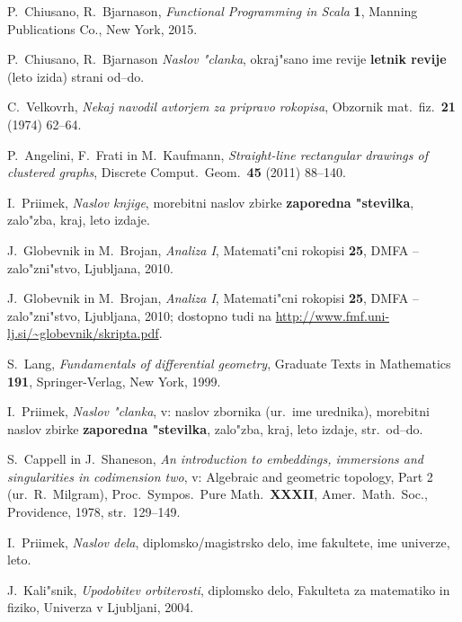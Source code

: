 \documentclass[12pt,a4paper]{amsart}
\theoremstyle{definition} %
\theoremstyle{plain} %
\begin{document}
\begin{thebibliography}{99}

P.~Chiusano, R.~Bjarnason, \emph{Functional Programming in Scala}  \textbf{1}, Manning Publications Co., New York, 2015.

P.~Chiusano, R.~Bjarnason \emph{Naslov "clanka}, okraj"sano ime revije \textbf{letnik revije} (leto izida) strani od--do.

C.~Velkovrh, \emph{Nekaj navodil avtorjem za pripravo rokopisa}, Obzornik mat.\ fiz.\ \textbf{21} (1974) 62--64.

P.~Angelini, F.~Frati in M.~Kaufmann, \emph{Straight-line rectangular drawings of clustered graphs}, Discrete Comput.\ Geom.\ \textbf{45} (2011) 88--140.



I.~Priimek, \emph{Naslov knjige}, morebitni naslov zbirke  \textbf{zaporedna "stevilka}, zalo"zba, kraj, leto izdaje.

J.~Globevnik in M.~Brojan, \emph{Analiza I}, Matemati"cni rokopisi \textbf{25}, DMFA -- zalo"zni"stvo, Ljubljana, 2010.

J.~Globevnik in M.~Brojan, \emph{Analiza I}, Matemati"cni rokopisi \textbf{25}, DMFA -- zalo"zni"stvo, Ljubljana, 2010; dostopno tudi na
\url{http://www.fmf.uni-lj.si/~globevnik/skripta.pdf}.

S.~Lang, \emph{Fundamentals of differential geometry}, Graduate Texts in Mathematics {\bf 191}, Springer-Verlag, New York, 1999.



I.~Priimek, \emph{Naslov "clanka}, v: naslov zbornika (ur.\ ime urednika), morebitni naslov zbirke  \textbf{zaporedna "stevilka}, zalo"zba, kraj, leto izdaje, str.\ od--do.

S.~Cappell in J.~Shaneson, \emph{An introduction to embeddings, immersions and singularities in codimension two}, v: Algebraic and geometric topology, Part 2 (ur.\ R.~Milgram), Proc.\ Sympos.\ Pure Math.\ \textbf{XXXII}, Amer.\ Math.\ Soc., Providence, 1978, str.\ 129--149.



I.~Priimek, \emph{Naslov dela}, diplomsko/magistrsko delo, ime fakultete, ime univerze, leto.

J.~Kali"snik, \emph{Upodobitev orbiterosti}, diplomsko delo, Fakulteta za matematiko in fiziko, Univerza v Ljubljani, 2004.




\end{thebibliography}
\end{document}
